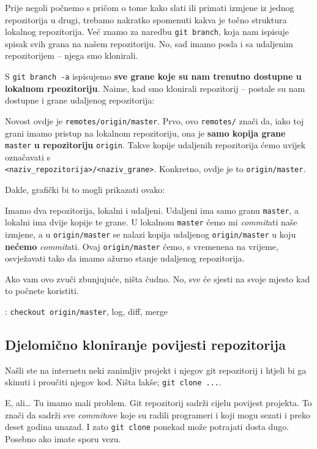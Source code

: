 Prije negoli počnemo s pričom o tome kako slati ili primati izmjene iz jednog repozitorija u drugi, trebamo nakratko spomenuti kakva je točno struktura lokalnog repozitorija.
Već znamo za naredbu \verb+git branch+, koja nam ispisuje spisak svih grana na našem repozitoriju.
No, sad imamo posla i sa udaljenim repozitorijem -- njega smo klonirali.

S \verb+git branch -a+ ispisujemo \textbf{sve grane koje su nam trenutno dostupne u lokalnom rpeozitoriju}.
Naime, kad smo klonirali repozitorij -- postale su nam dostupne i grane udaljenog repozitorija:



Novost ovdje je \verb+remotes/origin/master+.
Prvo, ovo \verb+remotes/+ znači da, iako toj grani imamo pristup na lokalnom repozitoriju, ona je \textbf{samo kopija grane} \verb+master+ \textbf{u repozitoriju} \verb+origin+.
Takve kopije udaljenih repozitorija ćemo uvijek označavati s \\ \verb+<naziv_repozitorija>/<naziv_grane>+.
Konkretno, ovdje je to \verb+origin/master+.

Dakle, grafički bi to mogli prikazati ovako:



Imamo dva repozitorija, lokalni i udaljeni.
Udaljeni ima samo granu \verb+master+, a lokalni ima dvije kopije te grane. 
U lokalnom \verb+master+ ćemo mi \emph{commit}ati naše izmjene, a u \verb+origin/master+ se nalazi kopija udaljenog \verb+origin/master+ u koju \textbf{nećemo} \emph{commit}ati.
Ovaj \verb+origin/master+ ćemo, s vremenena na vrijeme, osvježavati tako da imamo ažurno stanje udaljenog repozitorija.

Ako vam ovo zvuči zbunjujuće, ništa čudno.
No, sve će sjesti na svoje mjesto kad to počnete koristiti.

\TODO: \verb+checkout origin/master+, log, diff, merge

\subsection*{Djelomično kloniranje povijesti repozitorija}

Našli ste na internetu neki zanimljiv projekt i njegov git repozitorij i htjeli bi ga skinuti i proučiti njegov kod. 
Ništa lakše; \verb+git clone ...+.

E, ali\dots
Tu imamo mali problem.
Git repozitorij sadrži cijelu povijest projekta. 
To znači da sadrži sve \emph{commit}ove koje su radili programeri i koji mogu sezati i preko deset godina unazad.
I zato \verb+git clone+ ponekad može potrajati dosta dugo. 
Posebno ako imate sporu vezu.

